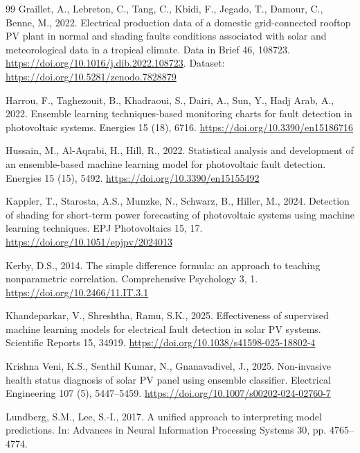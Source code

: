 \documentclass[11pt,a4paper]{article}
\begin{document}
\begin{thebibliography}{99}
Graillet, A., Lebreton, C., Tang, C., Kbidi, F., Jegado, T., Damour, C., Benne, M., 2022. Electrical production data of a domestic grid-connected rooftop PV plant in normal and shading faults conditions associated with solar and meteorological data in a tropical climate. Data in Brief 46, 108723. \url{https://doi.org/10.1016/j.dib.2022.108723}. Dataset: \url{https://doi.org/10.5281/zenodo.7828879}

Harrou, F., Taghezouit, B., Khadraoui, S., Dairi, A., Sun, Y., Hadj Arab, A., 2022. Ensemble learning techniques-based monitoring charts for fault detection in photovoltaic systems. Energies 15 (18), 6716. \url{https://doi.org/10.3390/en15186716}

Hussain, M., Al-Aqrabi, H., Hill, R., 2022. Statistical analysis and development of an ensemble-based machine learning model for photovoltaic fault detection. Energies 15 (15), 5492. \url{https://doi.org/10.3390/en15155492}

Kappler, T., Starosta, A.S., Munzke, N., Schwarz, B., Hiller, M., 2024. Detection of shading for short-term power forecasting of photovoltaic systems using machine learning techniques. EPJ Photovoltaics 15, 17. \url{https://doi.org/10.1051/epjpv/2024013}

Kerby, D.S., 2014. The simple difference formula: an approach to teaching nonparametric correlation. Comprehensive Psychology 3, 1. \url{https://doi.org/10.2466/11.IT.3.1}

Khandeparkar, V., Shreshtha, Ramu, S.K., 2025. Effectiveness of supervised machine learning models for electrical fault detection in solar PV systems. Scientific Reports 15, 34919. \url{https://doi.org/10.1038/s41598-025-18802-4}

Krishna Veni, K.S., Senthil Kumar, N., Gnanavadivel, J., 2025. Non-invasive health status diagnosis of solar PV panel using ensemble classifier. Electrical Engineering 107 (5), 5447--5459. \url{https://doi.org/10.1007/s00202-024-02760-7}

Lundberg, S.M., Lee, S.-I., 2017. A unified approach to interpreting model predictions. In: Advances in Neural Information Processing Systems 30, pp. 4765--4774.


\end{thebibliography}
\end{document}
